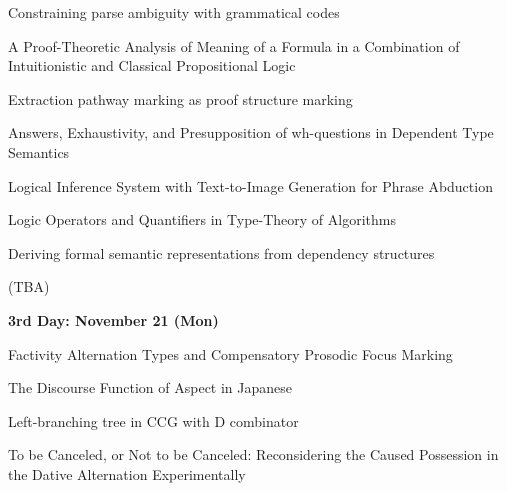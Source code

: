 \documentclass[12pt]{jarticle}
\begin{document}
      {Constraining parse ambiguity with grammatical codes}
      {}




  
      {A Proof-Theoretic Analysis of Meaning of a Formula in a Combination of Intuitionistic and Classical Propositional Logic}
      {}
  
      {Extraction pathway marking as proof structure marking}
      {}
  
      {Answers, Exhaustivity, and Presupposition of wh-questions in Dependent Type Semantics}
      {}




  
      {Logical Inference System with Text-to-Image Generation for Phrase Abduction}
      {}
  
      {Logic Operators and Quantifiers in Type-Theory of Algorithms}
      {}
  
      {Deriving formal semantic representations from dependency structures}
      {}




  
      {(TBA)}
      {}




\noindent\textbf{\large 
3rd Day: November 21 (Mon)
}\\




  
      {Factivity Alternation Types and Compensatory Prosodic Focus Marking}
      {}
  
      {The Discourse Function of Aspect in Japanese}
      {}
  
      {Left-branching tree in CCG with D combinator}
      {}




  
      {To be Canceled, or Not to be Canceled: Reconsidering the Caused Possession in the Dative Alternation Experimentally}
      {}
  
\end{document}
